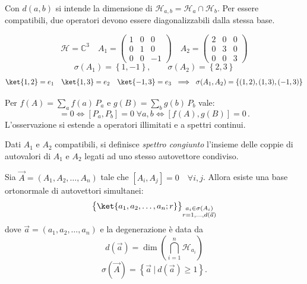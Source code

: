 \begin{remark}
    Con \(d(a,b)\) si intende la dimensione di \(\mathcal{H}_{a,b}= \mathcal{H}_a\cap \mathcal{H}_b\). Per essere compatibili, due operatori devono essere diagonalizzabili dalla stessa base.
\end{remark}

\begin{example}
    \[
        \mathcal{H}= \mathbb{C}^3   \quad   A_1 = \begin{pmatrix}
            1&0&0\\0&1&0\\0&0&-1
        \end{pmatrix}
        \quad 
        A_2= \begin{pmatrix}
            2&0&0\\0&3&0\\0&0&3
        \end{pmatrix}
    \]
    \[
\sigma(A_1)= \left\{ 1, -1 \right\}, \qquad 
\sigma(A_2)= \left\{ 2, 3 \right\}
\]
\[
\ket{1,2}= e_1 \quad \ket{1,3}=e_2 \quad \ket{-1,3}=e_3\
\implies \ \sigma(A_1, A_2)= \left\{ (1,2), (1,3), (-1,3) \right\}
\]
\end{example}



\begin{remark}
    Per \(f(A) = \sum_a f(a)\, P_a\) e \( g(B) = \sum_b g(b)\, P_b \) vale:
    \begin{equation}
        [A,B]=0 \iff [P_a,P_b]=0\; \forall a,b \iff [f(A),g(B)]=0 \, .
    \end{equation}
    L'osservazione si estende a operatori illimitati e a spettri continui.
\end{remark}
\begin{definition}
    Dati \( A_1 \) e \( A_2 \) compatibili, si definisce \textit{spettro congiunto} l’insieme delle coppie di autovalori di \(A_1\) e \(A_2\)
    legati ad uno stesso autovettore condiviso.
\end{definition}
Sia \(\vec{A} = (A_1, A_2, \dots, A_n)\) tale che \([A_i, A_j] = 0 \quad \forall i,j\).  
Allora esiste una base ortonormale di autovettori simultanei:
\begin{equation}
    \big\{ \ket{a_1, a_2, \dots, a_n; r} \big\}_{\substack{a_i \in \sigma(A_i)\\ r=1,\dots,d(\vec{a})}}
\end{equation}
dove \(\vec{a} = (a_1, a_2, \dots, a_n)\) e la degenerazione è data da
\begin{equation}
    d(\vec{a}) = \dim\!\left( \bigcap_{i=1}^{n} \mathcal{H}_{a_i} \right)
\end{equation}
\begin{equation}
    \sigma(\vec{A}) = \left\{ \vec{a}\ \big|\ d(\vec{a}) \geq 1 \right\}.
\end{equation}

